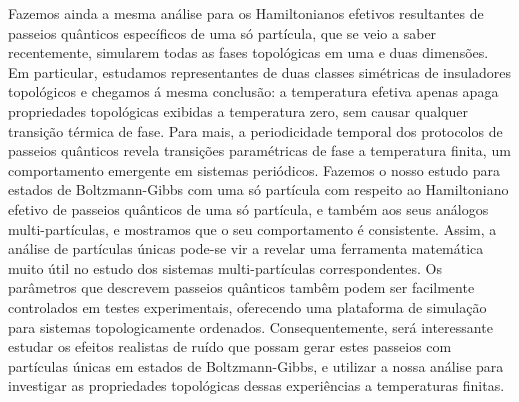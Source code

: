 \documentclass[12pt]{report}
\begin{document}
Fazemos ainda a mesma an\'{a}lise para os Hamiltonianos efetivos resultantes de passeios qu\^{a}nticos espec\'{i}ficos de uma s\'{o} part\'{i}cula, que se veio a saber recentemente, simularem todas as fases topol\'{o}gicas em uma e duas dimens\~{o}es. Em particular, estudamos representantes de duas classes sim\'{e}tricas de insuladores topol\'{o}gicos e chegamos \'{a} mesma conclus\~{a}o: a temperatura efetiva apenas apaga propriedades topol\'{o}gicas exibidas a temperatura zero, sem causar qualquer transi\c{c}\~{a}o t\'{e}rmica de fase. Para mais, a periodicidade temporal dos protocolos de passeios qu\^{a}nticos revela transi\c{c}\~{o}es param\'{e}tricas de fase a temperatura finita, um comportamento emergente em sistemas peri\'{o}dicos. Fazemos o nosso estudo para estados de Boltzmann-Gibbs com uma s\'{o} part\'{i}cula com respeito ao Hamiltoniano efetivo de passeios qu\^{a}nticos de uma s\'{o} part\'{i}cula, e tamb\'{e}m aos seus an\'{a}logos multi-part\'{i}culas, e mostramos que o seu comportamento \'{e} consistente. Assim, a an\'{a}lise de part\'{i}culas \'{u}nicas pode-se vir a revelar uma ferramenta matem\'{a}tica muito \'{u}til no estudo dos sistemas multi-part\'{i}culas correspondentes. Os par\^{a}metros que descrevem passeios qu\^{a}nticos tamb\^{e}m podem ser facilmente controlados em testes experimentais, oferecendo uma plataforma de simula\c{c}\~{a}o para sistemas topologicamente ordenados. Consequentemente, ser\'{a} interessante estudar os efeitos realistas de ru\'{i}do que possam gerar estes passeios com part\'{i}culas \'{u}nicas em estados de Boltzmann-Gibbs, e utilizar a nossa an\'{a}lise para investigar as propriedades topol\'{o}gicas dessas experi\^{e}ncias a temperaturas finitas.
\end{document}
